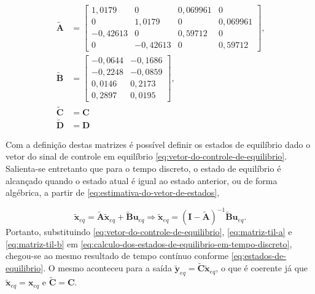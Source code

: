 \begin{subequations}
    \label{eq:matrizes-do-espaco-de-estados-discretizadas}
    \begin{align}
        \mathbf{\tilde{A}} & =
        \begin{bmatrix}
            \label{eq:matriz-til-a}
            1,0179 & 0       & 0,069961 & 0      \\
            0       & 1,0179 & 0      & 0,069961 \\
            -0,42613 & 0       & 0,59712 & 0      \\
            0       & -0,42613  & 0     & 0,59712
        \end{bmatrix}\text{,} \\
        \mathbf{\tilde{B}} & =
        \begin{bmatrix}
            \label{eq:matriz-til-b}
            -0,0644 & -0,1686  \\
            -0,2248 & -0,0859  \\
            0,0146  & 0,2173   \\
            0,2897  & 0,0195
        \end{bmatrix}\text{,} \\
        \mathbf{\tilde{C}} &= \mathbf{C} \\
        \mathbf{\tilde{D}} &= \mathbf{D}
    \end{align}
\end{subequations}

Com a definição destas matrizes é possível definir os estados de equilíbrio dado
o vetor do sinal de controle em equilíbrio
\ref{eq:vetor-do-controle-de-equilibrio}. Salienta-se entretanto que para o
tempo discreto, o estado de equilíbrio é alcançado quando o estado atual é igual
ao estado anterior, ou de forma algébrica, a partir de
\ref{eq:estimativa-do-vetor-de-estados},

\begin{equation}
    \label{eq:calculo-dos-estados-de-equilibrio-em-tempo-discreto}
    \mathbf{\tilde{x}}_{eq} = \mathbf{\tilde{A}}\mathbf{\tilde{x}}_{eq} + \mathbf{\tilde{B}}\mathbf{u}_{eq}
    \Rightarrow
    \mathbf{\tilde{x}}_{eq} = (\mathbf{I}-\mathbf{\tilde{A}})^{-1}\mathbf{\tilde{B}}\mathbf{u}_{eq}.
\end{equation} Portanto, substituindo \ref{eq:vetor-do-controle-de-equilibrio},
\ref{eq:matriz-til-a} e \ref{eq:matriz-til-b} em
\ref{eq:calculo-dos-estados-de-equilibrio-em-tempo-discreto}, chegou-se ao mesmo
resultado de tempo contínuo conforme \ref{eq:estados-de-equilibrio}. O mesmo
aconteceu para a saída $\mathbf{\tilde{y}}_{eq} =
\mathbf{\tilde{C}}\mathbf{\tilde{x}}_{eq}$, o que é coerente já que
$\mathbf{\tilde{x}}_{eq} = \mathbf{x}_{eq}$ e $\mathbf{\tilde{C}} = \mathbf{C}$.

